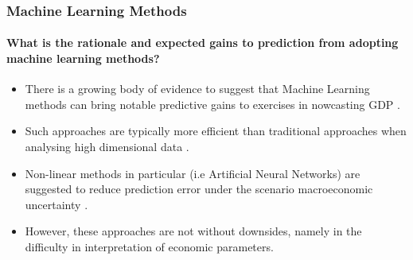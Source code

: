 \begin{frame}

    \frametitle{Machine Learning Methods}
    \framesubtitle{What is the rationale and expected gains to prediction from adopting machine learning methods?}

    \begin{itemize}
        \item There is a growing body of evidence to suggest that Machine Learning methods can bring notable predictive gains to exercises in nowcasting GDP 
        \parencite{kant}. 
        \item Such approaches are typically more efficient  than traditional approaches when analysing high dimensional data \parencite{kapetanios}. 
        \item Non-linear methods in particular (i.e Artificial Neural Networks) are suggested to reduce prediction error under the scenario macroeconomic uncertainty \parencite{coulombe}.
        \item However, these approaches are not without downsides, namely in the difficulty in interpretation of economic parameters.
        
    \end{itemize}

\end{frame}